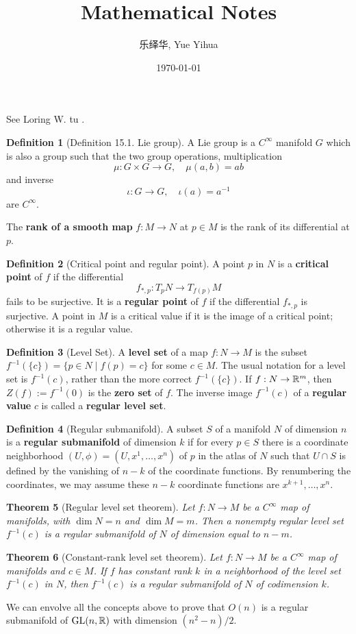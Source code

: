 \documentclass{amsart}
\author{乐绎华, Yue Yihua}
\date{\today}
\title{Mathematical Notes}
\let\originalmathbb\mathbb
\renewcommand{\mathbb}[1]{%
    \ifstrequal{#1}{1}{\mathbbm{#1}}{\originalmathbb{#1}}%
}
\theoremstyle{plain}
\newtheorem{theorem}{Theorem}[section]
\theoremstyle{definition}
\newtheorem{definition}[theorem]{Definition}
\theoremstyle{remark}
\begin{document}
\maketitle
\tableofcontents

See Loring W. tu .

\begin{definition}[Definition 15.1. Lie group]
A Lie group is a $C^{\infty}$ manifold $G$ which is also a group such that the two group operations, multiplication
\[
\mu: G \times G \rightarrow G, \quad \mu(a, b)=a b
\]and inverse
\[
\iota: G \rightarrow G, \quad \iota(a)=a^{-1}
\]are $C^{\infty}$.
\end{definition}
The \textbf{rank of a smooth map} $f:M\to N$ at $p\in M$ is the rank of its differential at $p$.

\begin{definition}[Critical point and regular point]
A point $p$ in $N$ is a \textbf{critical point} of $f$ if the differential
\[
f_{*, p}: T_p N \rightarrow T_{f(p)} M
\]fails to be surjective. It is a \textbf{regular point} of $f$ if the differential $f_{*, p}$ is surjective.
A point in $M$ is a critical value if it is the image of a critical point; otherwise it is a regular value.
\end{definition}
\begin{definition}[Level Set]
A \textbf{level set} of a map $f: N \rightarrow M$ is the subset $f^{-1}(\{c\}) = \{p \in N \mid f(p)=c\}$ for some $c \in M$. The usual notation for a level set is $f^{-1}(c)$, rather than the more correct $f^{-1}(\{c\})$. If $f: N \rightarrow \mathbb{R}^m$, then $Z(f) := f^{-1}(0)$ is the \textbf{zero set} of $f$. The inverse image $f^{-1}(c)$ of a \textbf{regular value} $c$ is called a \textbf{regular level set}.
\end{definition}
\begin{definition}[Regular submanifold]
A subset $S$ of a manifold $N$ of dimension $n$ is a \textbf{regular submanifold} of dimension $k$ if for every $p \in S$ there is a coordinate neighborhood $(U, \phi) = (U, x^1, \ldots, x^n)$ of $p$ in the atlas of $N$ such that $U \cap S$ is defined by the vanishing of $n-k$ of the coordinate functions. By renumbering the coordinates, we may assume these $n-k$ coordinate functions are $x^{k+1}, \ldots, x^n$.
\end{definition}
\begin{theorem}[Regular level set theorem]
Let $f: N \rightarrow M$ be a $C^{\infty}$ map of manifolds, with $\operatorname{dim} N=n$ and $\operatorname{dim} M=m$. Then a nonempty regular level set $f^{-1}(c)$ is a regular submanifold of $N$ of dimension equal to $n-m$.
\end{theorem}
\begin{theorem}[Constant-rank level set theorem]
Let $f: N \rightarrow M$ be a $C^{\infty}$ map of manifolds and $c \in M$. If $f$ has constant rank $k$ in a neighborhood of the level set $f^{-1}(c)$ in $N$, then $f^{-1}(c)$ is a regular submanifold of $N$ of codimension $k$.
\end{theorem}
We can envolve all the concepts above to prove that $O(n)$ is a regular submanifold of $\mathrm{GL}(n,\mathbb{R})$ with dimension $(n^{2}-n)/2$.
\end{document}
